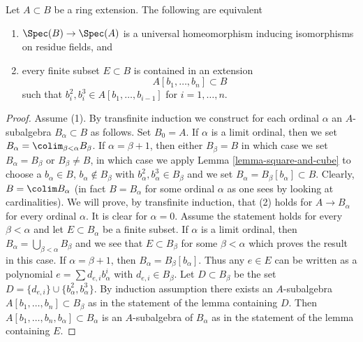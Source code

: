 \begin{proposition}
\label{proposition-universal-homeomorphism-equal-residue-fields}
Let $A \subset B$ be a ring extension. The following are equivalent
\begin{enumerate}
\item $\Spec(B) \to \Spec(A)$ is a universal homeomorphism inducing
isomorphisms on residue fields, and
\item every finite subset $E \subset B$ is contained in an extension
$$
A[b_1, \ldots, b_n] \subset B
$$
such that $b_i^2, b_i^3 \in A[b_1, \ldots, b_{i - 1}]$ for $i = 1, \ldots, n$.
\end{enumerate}
\end{proposition}

\begin{proof}
Assume (1). By transfinite induction we construct for each ordinal $\alpha$
an $A$-subalgebra $B_\alpha \subset B$ as follows. Set $B_0 = A$. If $\alpha$
is a limit ordinal, then we set $B_\alpha = \colim_{\beta < \alpha} B_\beta$.
If $\alpha = \beta + 1$, then either
$B_\beta = B$ in which case we set $B_\alpha = B_\beta$ or
$B_\beta \not = B$, in which case we apply Lemma \ref{lemma-square-and-cube}
to choose a $b_\alpha \in B$, $b_\alpha \not \in B_\beta$ with
$b_\alpha^2, b_\alpha^3 \in B_\beta$
and we set $B_\alpha = B_\beta[b_\alpha] \subset B$.
Clearly, $B = \colim B_\alpha$ (in fact $B = B_\alpha$ for some
ordinal $\alpha$ as one sees by looking at cardinalities).
We will prove, by transfinite induction, that (2) holds for
$A \to B_\alpha$ for every ordinal $\alpha$. It is clear for
$\alpha = 0$. Assume the statement holds for every $\beta < \alpha$
and let $E \subset B_\alpha$ be a finite subset.
If $\alpha$ is a limit ordinal, then
$B_\alpha = \bigcup_{\beta < \alpha} B_\beta$ and we see
that $E \subset B_\beta$ for some $\beta < \alpha$ which
proves the result in this case. If $\alpha = \beta + 1$,
then $B_\alpha = B_\beta[b_\alpha]$. Thus any $e \in E$
can be written as a polynomial $e = \sum d_{e, i}b_\alpha^i$
with $d_{e, i} \in B_\beta$. Let $D \subset B_\beta$
be the set $D = \{d_{e, i}\} \cup \{b_\alpha^2, b_\alpha^3\}$.
By induction assumption
there exists an $A$-subalgebra $A[b_1, \ldots, b_n] \subset B_\beta$
as in the statement of the lemma containing $D$.
Then $A[b_1, \ldots, b_n, b_\alpha] \subset B_\alpha$
is an $A$-subalgebra of $B_\alpha$ as in the statement
of the lemma containing $E$.


\end{proof}
